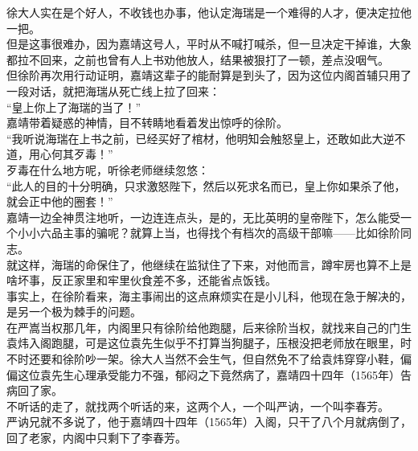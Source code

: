 \begin{multicols}{\theparacolNo}
徐大人实在是个好人，不收钱也办事，他认定海瑞是一个难得的人才，便决定拉他一把。\\

但是这事很难办，因为嘉靖这号人，平时从不喊打喊杀，但一旦决定干掉谁，大象都拉不回来，之前也曾有人上书劝他放人，结果被狠打了一顿，差点没咽气。\\

但徐阶再次用行动证明，嘉靖这辈子的能耐算是到头了，因为这位内阁首辅只用了一段对话，就把海瑞从死亡线上拉了回来：\\

“皇上你上了海瑞的当了！”\\

嘉靖带着疑惑的神情，目不转睛地看着发出惊呼的徐阶。\\

“我听说海瑞在上书之前，已经买好了棺材，他明知会触怒皇上，还敢如此大逆不道，用心何其歹毒！”\\

歹毒在什么地方呢，听徐老师继续忽悠：\\

“此人的目的十分明确，只求激怒陛下，然后以死求名而已，皇上你如果杀了他，就会正中他的圈套！”\\

嘉靖一边全神贯注地听，一边连连点头，是的，无比英明的皇帝陛下，怎么能受一个小小六品主事的骗呢？就算上当，也得找个有档次的高级干部嘛——比如徐阶同志。\\

就这样，海瑞的命保住了，他继续在监狱住了下来，对他而言，蹲牢房也算不上是啥坏事，反正家里和牢里伙食差不多，还能省点饭钱。\\

事实上，在徐阶看来，海主事闹出的这点麻烦实在是小儿科，他现在急于解决的，是另一个极为棘手的问题。\\

在严嵩当权那几年，内阁里只有徐阶给他跑腿，后来徐阶当权，就找来自己的门生袁炜入阁跑腿，可是这位袁先生似乎不打算当狗腿子，压根没把老师放在眼里，时不时还要和徐阶吵一架。徐大人当然不会生气，但自然免不了给袁炜穿穿小鞋，偏偏这位袁先生心理承受能力不强，郁闷之下竟然病了，嘉靖四十四年（1565年）告病回了家。\\

不听话的走了，就找两个听话的来，这两个人，一个叫严讷，一个叫李春芳。\\

严讷兄就不多说了，他于嘉靖四十四年（1565年）入阁，只干了八个月就病倒了，回了老家，内阁中只剩下了李春芳。\\


\end{multicols}
